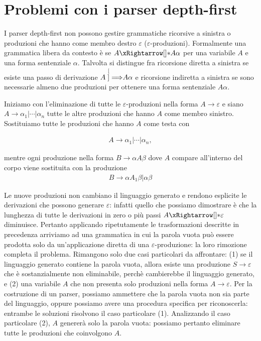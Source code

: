 
\section{Problemi con i parser depth-first}
\label{sec:no-ricorsione-sinistra}

I parser depth-first non possono gestire grammatiche ricorsive a sinistra o produzioni che hanno come membro destro
$\varepsilon$ ($\varepsilon$-produzioni).
Formalmente una grammatica libera da contesto è  se $A\eprod{} A\alpha$ per una variabile
$A$ e una forma sentenziale $\alpha$.
Talvolta si distingue fra ricorsione diretta a sinistra se esiste una passo di derivazione $A\stackrel[]{}{\Longrightarrow} A\alpha$ e ricorsione
indiretta a sinistra se sono necessarie almeno due produzioni per ottenere una forma sentenziale $A\alpha$.

Iniziamo con l'eliminazione di tutte le $\varepsilon$-produzioni nella forma $A\to \varepsilon$ e siano
$A\to \alpha_{1} | \cdots | \alpha_{n}$ tutte le altre produzioni che hanno $A$ come membro sinistro.
Sostituiamo tutte le produzioni che hanno $A$ come testa  con

\begin{gather}
A\to \alpha_{1} | \cdots | \alpha_{n},
\end{gather}

mentre ogni produzione nella forma $B\to \alpha A\beta$ dove $A$ compare all'interno del corpo viene sostituita
con la produzione
\begin{gather}
B\to \alpha A_{1}\beta | \alpha \beta
\end{gather}

Le nuove produzioni non cambiano il linguaggio generato e rendono esplicite le derivazioni che possono
generare $\varepsilon$: infatti quello che possiamo dimostrare è che la lunghezza di tutte le derivazioni in zero o più passi
$A\eprod{} \varepsilon$ diminuisce.
Pertanto applicando ripetutamente le trasformazioni descritte in precedenza arriviamo ad una grammatica in cui la parola
vuota può essere prodotta solo da un'applicazione diretta di una $\varepsilon$-produzione: la loro rimozione completa il
problema.
Rimangono solo due casi particolari da affrontare: (1) se il linguaggio generato contiene la parola vuota, allora esiste
una produzione $S\to \varepsilon$ che è sostanzialmente non eliminabile, perchè cambierebbe il linguaggio generato, e
(2) una variabile $A$ che non presenta solo produzioni nella forma $A\to \varepsilon$.
Per la costruzione di un parser, possiamo ammettere che la parola vuota non sia parte del linguaggio, oppure possiamo
avere una procedura specifica per riconoscerla: entrambe le soluzioni risolvono il caso particolare (1).
Analizzando il caso particolare (2), $A$ genererà solo la parola vuota: possiamo pertanto eliminare tutte le produzioni
che coinvolgono $A$.


